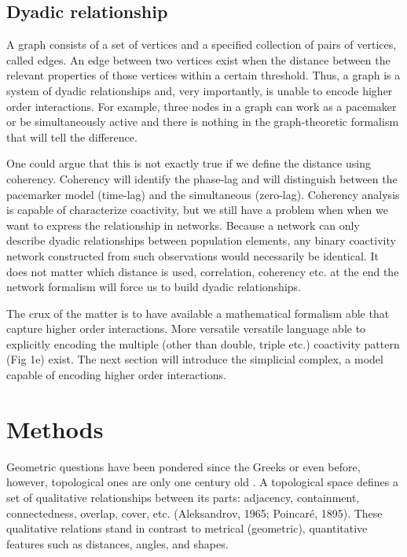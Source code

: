 \documentclass[onecollarge,runningheads]{svjour2}
\begin{document}
\subsection{Dyadic relationship}
A graph consists of a set of vertices and a specified collection of pairs of vertices, called edges. An edge between two vertices exist when the distance between the relevant properties of those vertices within a certain threshold. Thus, a graph is a system of dyadic relationships and, very importantly, is unable to encode higher order interactions. For example, three nodes in a graph can work as a pacemaker or be simultaneously active and there is nothing in the graph-theoretic formalism that will tell the difference.

One could argue that this is not exactly true if we define the distance using coherency.
Coherency will identify the phase-lag and will distinguish between the pacemarker model (time-lag) and the simultaneous (zero-lag). %
Coherency analysis is capable of characterize coactivity, but we still have a problem when   when we want to express the relationship in networks. Because a network can only describe dyadic relationships between population elements, any binary coactivity network constructed from such observations would necessarily be identical. 
It does not matter which distance is used, correlation, coherency etc. at the end the network formalism will force us to build dyadic relationships.

The crux of the matter is to have available a mathematical formalism able that capture higher order interactions. More versatile versatile language able to explicitly encoding the multiple (other than double, triple etc.) coactivity pattern (Fig 1e) exist. 
The next section will introduce the simplicial complex, a model capable of encoding higher order interactions.%
 
\section{Methods}

Geometric questions have been pondered since the Greeks or even before, however, topological ones are only one century old \citep{edelsbrunner2010computational}. 
A topological space defines a set of qualitative relationships between its parts: adjacency, containment, connectedness, overlap, cover, etc. (Aleksandrov, 1965; Poincaré, 1895). These qualitative relations stand in contrast to metrical (geometric), quantitative features such as distances, angles, and shapes.
\end{document}

